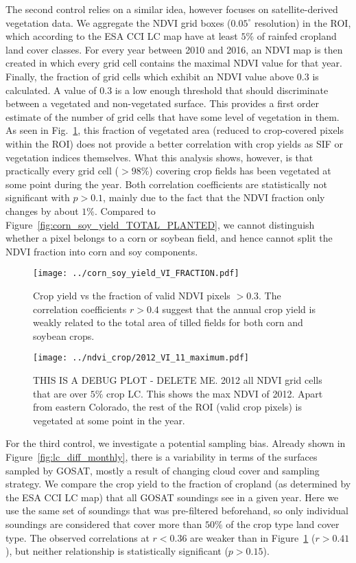 \documentclass[preprint, a4paper, 10pt, times]{elsarticle}
\begin{document}
The second control relies on a similar idea, however focuses on satellite-derived vegetation data. We aggregate the NDVI grid boxes ($0.05^\circ$ resolution) in the ROI, which according to the ESA CCI LC map have at least $5\%$ of rainfed cropland land cover classes. For every year between 2010 and 2016, an NDVI map is then created in which every grid cell contains the maximal NDVI value for that year. Finally, the fraction of grid cells which exhibit an NDVI value above $0.3$ is calculated. A value of $0.3$ is a low enough threshold that should discriminate between a vegetated and non-vegetated surface. This provides a first order estimate of the number of grid cells that have some level of vegetation in them. As seen in Fig.~\ref{fig:corn_soy_yield_VI_FRACTION}, this fraction of vegetated area (reduced to crop-covered pixels within the ROI) does not provide a better correlation with crop yields as SIF or vegetation indices themselves. What this analysis shows, however, is that practically every grid cell ($>98\%$) covering crop fields has been vegetated at some point during the year. Both correlation coefficients are statistically not significant with $p > 0.1$, mainly due to the fact that the NDVI fraction only changes by about $1\%$. Compared to Figure~\ref{fig:corn_soy_yield_TOTAL_PLANTED}, we cannot distinguish whether a pixel belongs to a corn or soybean field, and hence cannot split the NDVI fraction into corn and soy components.

\begin{figure}[htbp]
\centering
\texttt{[image: ../corn\_soy\_yield\_VI\_FRACTION.pdf]}
\caption{Crop yield vs the fraction of valid NDVI pixels $> 0.3$. The correlation coefficients $r > 0.4$ suggest that the annual crop yield is weakly related to the total area of tilled fields for both corn and soybean crops.}
\label{fig:corn_soy_yield_VI_FRACTION}
\end{figure}

\begin{figure}[htbp]
\centering
\texttt{[image: ../ndvi\_crop/2012\_VI\_11\_maximum.pdf]}
\caption{THIS IS A DEBUG PLOT - DELETE ME. 2012 all NDVI grid cells that are over $5\%$ crop LC. This shows the max NDVI of 2012. Apart from eastern Colorado, the rest of the ROI (valid crop pixels) is vegetated at some point in the year.}
\label{fig:debug1}
\end{figure}

For the third control, we investigate a potential sampling bias. Already shown in Figure~\ref{fig:lc_diff_monthly}, there is a variability in terms of the surfaces sampled by GOSAT, mostly a result of changing cloud cover and sampling strategy. We compare the crop yield to the fraction of cropland (as determined by the ESA CCI LC map) that all GOSAT soundings see in a given year. Here we use the same set of soundings that was pre-filtered beforehand, so only individual soundings are considered that cover more than $50\%$ of the crop type land cover type. The observed correlations at $r < 0.36$ are weaker than in Figure~\ref{fig:corn_soy_yield_VI_FRACTION} ($r > 0.41$), but neither relationship is statistically significant ($p > 0.15$).
\end{document}

